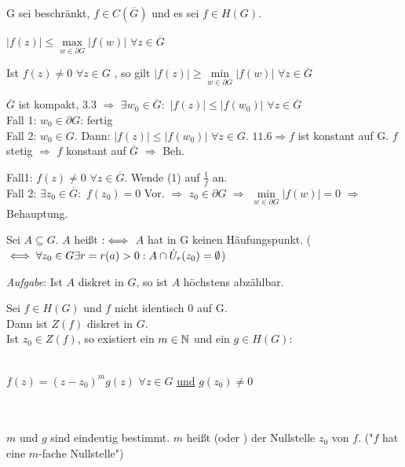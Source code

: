 \documentclass[a4paper,twoside,DIV15,BCOR12mm]{scrbook}
\begin{document}
\begin{satz}
G sei beschränkt, $f \in C(\overline{G})$ und es sei $f \in H(G)$.
\begin{liste}
\item $|f(z)|  \leq \max\limits_{w \in \partial G} |f(w)| $ $\forall z \in
\overline{G}$ 
\item Ist $f(z) \neq 0$ $\forall z \in G$ , so gilt $|f(z)| \geq \min\limits_{w
\in \partial G} |f(w)|$ $\forall z \in \overline{G}$
\end{liste}
\end{satz} 
\begin{beweis}
\begin{liste}
\item $\overline{G}$ ist kompakt, 3.3 $\Rightarrow $ $\exists w_0 \in
\overline{G}:$ $|f(z)| \leq |f(w_0)|$ $\forall z \in \overline{G}$ \\
Fall 1: $w_0 \in \partial G$: fertig \\
Fall 2: $w_0 \in G.$  Dann: $|f(z)| \leq |f(w_0)|$ $\forall z \in G.$ $11.6
\Rightarrow f$ ist konstant auf G. $f$ stetig $\Rightarrow$ $f$ konstant auf
$\overline{G}$ $\Rightarrow$ Beh.
\item Fall1: $f(z) \neq 0$ $\forall z \in \overline{G}$. Wende (1) auf
$\frac{1}{f}$ an. \\
Fall 2: $\exists z_0 \in \overline{G}: $ $f(z_0) = 0$ Vor. $\Rightarrow$ $z_0
\in \partial G$ $\Rightarrow$ $\min\limits_{w\in\partial G} |f(w)| = 0$
$\Rightarrow $ Behauptung. 
\end{liste}
\end{beweis}

\begin{definition}
Sei $A \subseteq G$. $A$ heißt  $:\iff$ $A$ hat in G
keinen Häufungspunkt. ($\iff \forall z_0 \in G \exists r = r(a) > 0 : A \cap
\dot{U}_r(z_0) = \emptyset$)
\end{definition}
\emph{Aufgabe}: Ist $A$ diskret in $G$, so ist $A$ höchstens abzählbar.

\begin{satz}
Sei $f \in H(G)$ und $f$ nicht identisch $0$ auf G. \\
Dann ist $Z(f)$ diskret in $G$. \\
Ist $z_0 \in Z(f)$, so existiert ein $m \in \mathbb{N}$ und ein $g \in H(G)$: \\ \\ 
\centerline{$f(z)
= (z-z_0)^m g(z)$ $\forall z \in G$ \underline{und} $g(z_0) \neq 0$} \\ \\$m$ und
$g$ sind eindeutig bestimmt. $m$ heißt  (oder
) der Nullstelle $z_0$ von $f$. ("$f$ hat eine $m$-fache Nullstelle")
\end{satz}
\end{document}
